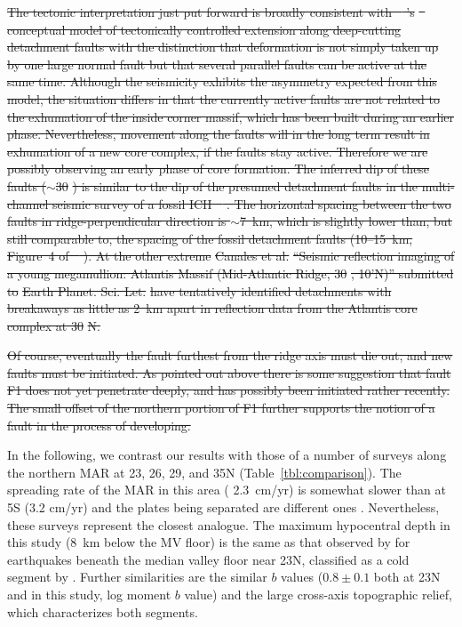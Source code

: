 \documentclass[jgrga]{agu2001} %
\newlength{\tw}
\providecommand{\DIFdel}[1]{{\protect\color{red}\sout{#1}}}                      %
\providecommand{\DIFdelbegin}{} %
\providecommand{\DIFdelend}{} %
\begin{document}
\begin{article}
\DIFdelbegin \DIFdel{The tectonic interpretation just put forward is broadly consistent
with \mbox{%
\citeauthor{tucholke94}}%
's }%
\DIFdel{\mbox{%
\citeyear{tucholke94}}%
}%
\DIFdel{conceptual
model of tectonically controlled extension along deep-cutting
detachment faults with the distinction that deformation is
not simply taken up by one large normal fault  but that several
parallel faults can be active at the same time.
Although the seismicity exhibits the asymmetry expected from this
model, the situation differs in that the currently active faults are
not related to the exhumation of the inside corner massif, which has
been built during an earlier phase. Nevertheless, movement along the
faults will in the long term result in exhumation of a new core
complex, if the faults stay active. Therefore we are possibly 
observing an early phase of core formation.
The inferred dip of
these faults ($\sim$30}%
\DIFdel{) is similar to the dip of the presumed
detachment faults in the multi-channel seismic survey of a fossil ICH
\mbox{%
\citep{ranero99}}%
.  The horizontal spacing between the two faults in
ridge-perpendicular direction is $\sim$7~km, which is slightly lower
than, but still comparable to, the spacing of the fossil detachment
faults (10--15~km, Figure~4 of \mbox{%
\citet{ranero99}}%
). At the other extreme
}%
\DIFdel{Canales et al.}%
\DIFdel{``Seismic reflection imaging of a young
megamullion: Atlantis Massif (Mid-Atlantic Ridge, 30}%
\DIFdel{, 10'N)'' submitted to }%
\DIFdel{Earth Planet. Sci. Let.}%
\DIFdel{have tentatively identified detachments with breakaways as little as
2~km apart in reflection data from the Atlantis core complex at 30}%
\DIFdel{N.
}\DIFdelend %


\DIFdelbegin \DIFdel{Of course, eventually the fault furthest
from the ridge axis must die out, and new faults must be
initiated. As pointed out above there is some suggestion that fault
F1 does not yet penetrate deeply, and has possibly been initiated
rather recently. The small offset of the northern portion of F1
further supports the notion of a fault in the process of developing.
}%

\DIFdelend In the following, we contrast our results with those of a number of
surveys along the northern MAR at 23\dg, 26\dg, 29\dg,  and 35\dg N (Table~\ref{tbl:comparison}).  The spreading
rate of the MAR in this area ( 2.3~cm/yr) is somewhat slower than
at 5\dg S (3.2 cm/yr) and the plates being separated are different
ones \citep{demets94}.
Nevertheless, these surveys represent the closest analogue.
The maximum hypocentral depth in this study (8~km below the MV
floor) is the same as that
observed by \citet{toomey88} for earthquakes beneath the median valley
floor near 23\dg N, classified as a cold segment by \citet{thibaud98}. Further similarities are the
similar $b$ values ($0.8\pm0.1$ both at 23\dg N and in this
study, log moment $b$ value) and the large cross-axis topographic relief, which
characterizes both segments.


\end{article}
\end{document}
